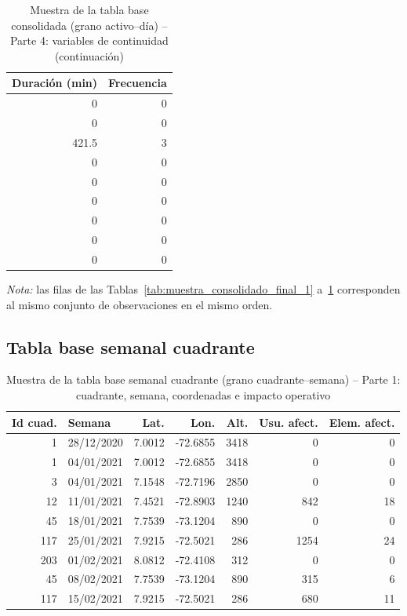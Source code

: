 \begin{table}[!htbp]
\centering
    \small
    \caption{Muestra de la tabla base consolidada (grano activo--día) -- Parte 4: variables de continuidad (continuación)}
    \label{tab:muestra_consolidado_final_4}
    \begin{tabular}{r r}
    \toprule
    \textbf{Duración (min)} & \textbf{Frecuencia} \\
    \midrule
    0     & 0 \\
    0     & 0 \\
    421.5 & 3 \\
    0     & 0 \\
    0     & 0 \\
    0     & 0 \\
    0     & 0 \\
    0     & 0 \\
    0     & 0 \\
    \bottomrule
    \end{tabular}
    \end{table}

\noindent\textit{Nota:} las filas de las Tablas~\ref{tab:muestra_consolidado_final_1} a~\ref{tab:muestra_consolidado_final_4} corresponden al mismo conjunto de observaciones en el mismo orden.

\subsection{Tabla base semanal cuadrante}
\label{app:muestra-semanal-completa}

\begin{table}[!htbp]
\centering
    \small
    \caption{Muestra de la tabla base semanal cuadrante (grano cuadrante--semana) -- Parte 1: cuadrante, semana, coordenadas e impacto operativo}
    \label{tab:muestra_semanal_cuadrante_1}
    \begin{tabular}{r l r r r r r}
    \toprule
    \textbf{Id cuad.} & \textbf{Semana} & \textbf{Lat.} & \textbf{Lon.} & \textbf{Alt.} & \textbf{Usu. afect.} & \textbf{Elem. afect.} \\
    \midrule
      1 & 28/12/2020 & 7.0012 & -72.6855 & 3418 &    0 &   0 \\
      1 & 04/01/2021 & 7.0012 & -72.6855 & 3418 &    0 &   0 \\
      3 & 04/01/2021 & 7.1548 & -72.7196 & 2850 &    0 &   0 \\
     12 & 11/01/2021 & 7.4521 & -72.8903 & 1240 &  842 &  18 \\
     45 & 18/01/2021 & 7.7539 & -73.1204 &  890 &    0 &   0 \\
    117 & 25/01/2021 & 7.9215 & -72.5021 &  286 & 1254 &  24 \\
    203 & 01/02/2021 & 8.0812 & -72.4108 &  312 &    0 &   0 \\
     45 & 08/02/2021 & 7.7539 & -73.1204 &  890 &  315 &   6 \\
    117 & 15/02/2021 & 7.9215 & -72.5021 &  286 &  680 &  11 \\
    \bottomrule
    \end{tabular}
    \end{table}

